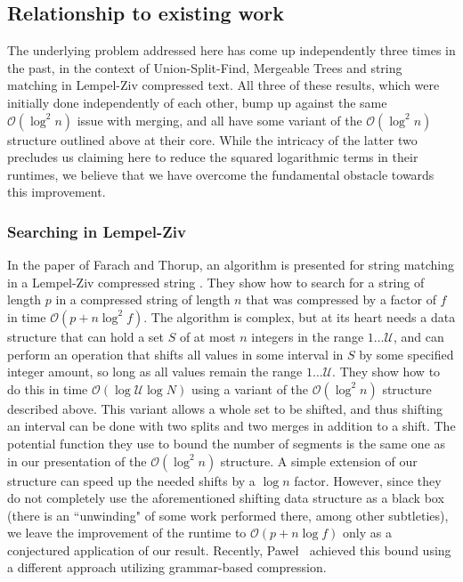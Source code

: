 \documentclass[11pt]{article}
\newcommand{\segments}{{\segment}s}
\newcommand{\segment}{segment}
\newcommand{\universe}{\ensuremath{\mathcal U}}
\newcommand{\set}[1]{\ensuremath{#1}}
\begin{document}
\subsection{Relationship to existing work} 
\label{sec:previous} 

The underlying problem addressed here has come up independently three times in the past, in the context of Union-Split-Find, Mergeable Trees and string matching in Lempel-Ziv compressed text. All three of these results, which were initially done independently of each other, bump up against the same $\mathcal O(\log^2n)$ issue with merging, and all have some variant of the $\mathcal O(\log^2n)$ structure outlined above at their core. While the intricacy of the latter two precludes us claiming here to reduce the squared logarithmic terms in their runtimes, we believe that we have overcome the fundamental obstacle towards this improvement. 


\subsubsection{Searching in Lempel-Ziv} 

In the paper of Farach and Thorup, an algorithm is presented for string matching in a Lempel-Ziv compressed string \cite{journals/algorithmica/FarachT98}. They show how to search for a string of length $p$ in a compressed string of length $n$ that was compressed by a factor of $f$ in time $\mathcal O(p + n \log^2 f)$. The algorithm is complex, but at its heart needs a data structure that can hold a set \set S of at most $n$ integers in the range $1 \ldots \universe$, and can perform an operation that shifts all values in some interval in \set S by some specified integer amount, so long as all values remain the range $1 \ldots \universe$. They show how to do this in time $\mathcal O(\log \universe \log {N})$ using a variant of the $\mathcal O(\log^2n)$ structure described above. This variant allows a whole set to be shifted, and thus shifting an interval can be done with two splits and two merges in addition to a shift. The potential function they use to bound the number of \segments{} is the same one as in our presentation of the $\mathcal O(\log^2 n)$ structure. A simple extension of our structure can speed up the needed shifts by a 
$\log n$ factor. However, since they do not completely use the aforementioned shifting data structure as a black box (there is an ``unwinding" of some work performed there, among other subtleties), we leave the improvement of the runtime to $\mathcal O(p + n \log f)$ only as a conjectured application of our result. Recently, Pawe\l~\cite{DBLP:conf/esa/Gawrychowski11} achieved this bound using a different approach utilizing grammar-based compression.
\end{document}
